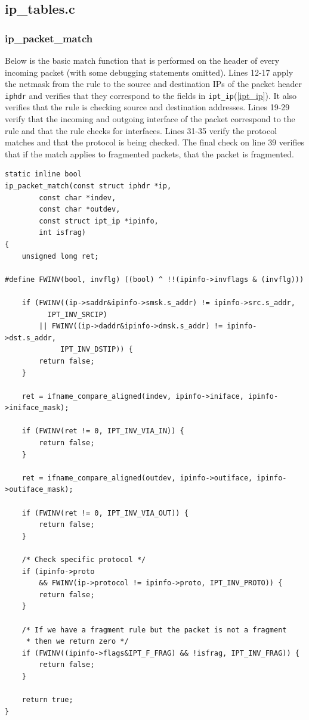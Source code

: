 \documentclass[a4paper,10pt]{article}
\newcommand{\code}[1]{\texttt{{#1}}}
\begin{document}
\subsection{ip\_tables.c}

\subsubsection{ip\_packet\_match}

Below is the basic match function that is performed on the header of
every incoming packet (with some debugging statements omitted). Lines
12-17 apply the netmask from the rule to the source and destination
IPs of the packet header \code{iphdr} and verifies that they
correspond to the fields in \code{ipt\_ip}(\ref{ipt_ip}). It also
verifies that the rule is checking source and destination
addresses. Lines 19-29 verify that the incoming and outgoing interface
of the packet correspond to the rule and that the rule checks for
interfaces. Lines 31-35 verify the protocol matches and that the
protocol is being checked. The final check on line 39 verifies that if
the match applies to fragmented packets, that the packet is
fragmented.


\lstset{stepnumber=1,frame=single,numbers=left,numberstyle=\footnotesize}

\begin{lstlisting}
static inline bool
ip_packet_match(const struct iphdr *ip,
		const char *indev,
		const char *outdev,
		const struct ipt_ip *ipinfo,
		int isfrag)
{
	unsigned long ret;

#define FWINV(bool, invflg) ((bool) ^ !!(ipinfo->invflags & (invflg)))

	if (FWINV((ip->saddr&ipinfo->smsk.s_addr) != ipinfo->src.s_addr,
		  IPT_INV_SRCIP)
	    || FWINV((ip->daddr&ipinfo->dmsk.s_addr) != ipinfo->dst.s_addr,
		     IPT_INV_DSTIP)) {
		return false;
	}

	ret = ifname_compare_aligned(indev, ipinfo->iniface, ipinfo->iniface_mask);

	if (FWINV(ret != 0, IPT_INV_VIA_IN)) {
		return false;
	}

	ret = ifname_compare_aligned(outdev, ipinfo->outiface, ipinfo->outiface_mask);

	if (FWINV(ret != 0, IPT_INV_VIA_OUT)) {
		return false;
	}

	/* Check specific protocol */
	if (ipinfo->proto
	    && FWINV(ip->protocol != ipinfo->proto, IPT_INV_PROTO)) {
		return false;
	}

	/* If we have a fragment rule but the packet is not a fragment
	 * then we return zero */
	if (FWINV((ipinfo->flags&IPT_F_FRAG) && !isfrag, IPT_INV_FRAG)) {
		return false;
	}

	return true;
}
\end{lstlisting}
\end{document}
